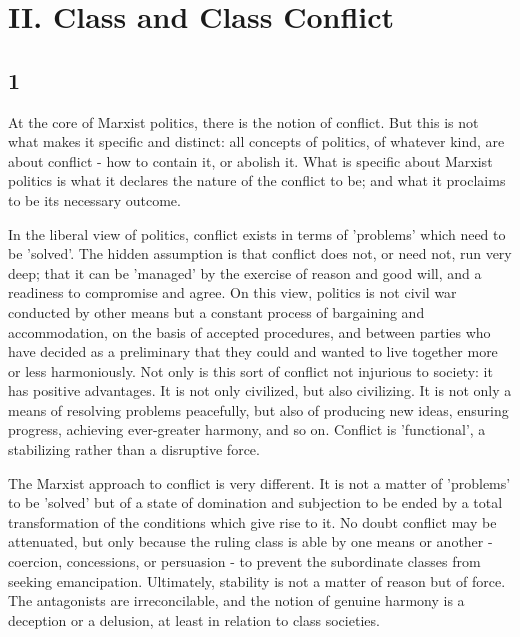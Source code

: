 \chapter*{II. Class and Class Conflict}


\section*{1}
At the core of Marxist politics, there is the notion of conflict. But this is not what makes it specific and distinct: all concepts of politics, of whatever kind, are about conflict - how to contain it, or abolish it. What is specific about Marxist politics is what it declares the nature of the conflict to be; and what it proclaims to be its necessary outcome.

In the liberal view of politics, conflict exists in terms of 'problems' which need to be 'solved'. The hidden assumption is that conflict does not, or need not, run very deep; that it can be 'managed' by the exercise of reason and good will, and a readiness to compromise and agree. On this view, politics is not civil war conducted by other means but a constant process of bargaining and accommodation, on the basis of accepted procedures, and between parties who have decided as a preliminary that they could and wanted to live together more or less harmoniously. Not only is this sort of conflict not injurious to society: it has positive advantages. It is not only civilized, but also civilizing. It is not only a means of resolving problems peacefully, but also of producing new ideas, ensuring progress, achieving ever-greater harmony, and so on. Conflict is 'functional', a stabilizing rather than a disruptive force.

The Marxist approach to conflict is very different. It is not a matter of 'problems' to be 'solved' but of a state of domination and subjection to be ended by a total transformation of the conditions which give rise to it. No doubt conflict may be attenuated, but only because the ruling class is able by one means or another - coercion, concessions, or persuasion - to prevent the subordinate classes from seeking emancipation. Ultimately, stability is not a matter of reason but of force. The antagonists are irreconcilable, and the notion of genuine harmony is a deception or a delusion, at least in relation to class societies.

